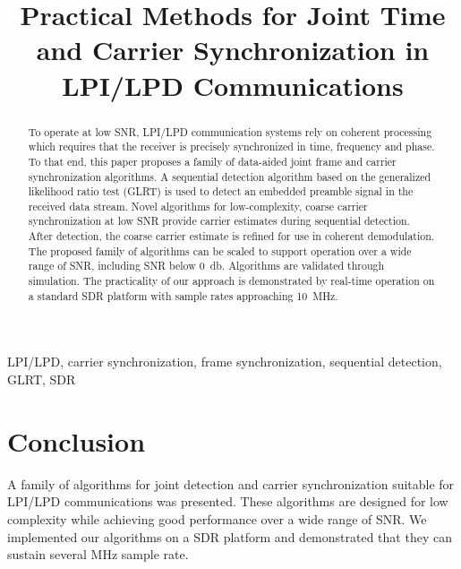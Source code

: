 \documentclass[10pt,final,conference,comsoc]{IEEEtran}
\begin{document}
\title{Practical Methods for Joint Time and Carrier Synchronization in
  LPI/LPD Communications}
\author{
}

\maketitle

\begin{abstract}
  To operate at low SNR, LPI/LPD communication systems rely on
  coherent processing which requires that the receiver is precisely
  synchronized in time, frequency and phase. 
  To that end, this paper proposes a family of data-aided joint
  frame and carrier synchronization algorithms.
  A sequential detection algorithm based on the generalized likelihood ratio test (GLRT)
  is used to detect an embedded preamble signal in the received data
  stream.
  Novel algorithms for low-complexity, coarse carrier synchronization
  at low SNR provide carrier estimates
  during sequential detection.
  After detection,
  the coarse carrier estimate is refined for use in coherent demodulation.
  The proposed family of algorithms can be scaled to support operation
  over a wide range of SNR, including SNR below \SI{0}{\decibel}.
  Algorithms are validated through simulation.
  The practicality of our approach is demonstrated by real-time operation on
  a standard SDR platform with sample rates approaching
  \SI{10}{\mega\hertz}.
\end{abstract}

\begin{IEEEkeywords}
LPI/LPD, carrier synchronization, frame synchronization, sequential
detection, GLRT, SDR
\end{IEEEkeywords}













\section{Conclusion}

A family of algorithms for joint detection and carrier synchronization
suitable for LPI/LPD communications was presented.
These algorithms are designed for low complexity while achieving good
performance over a wide range of SNR.\@
We implemented our algorithms on a SDR platform and demonstrated that
they can sustain several \si{\mega\hertz} sample rate.



\end{document}
